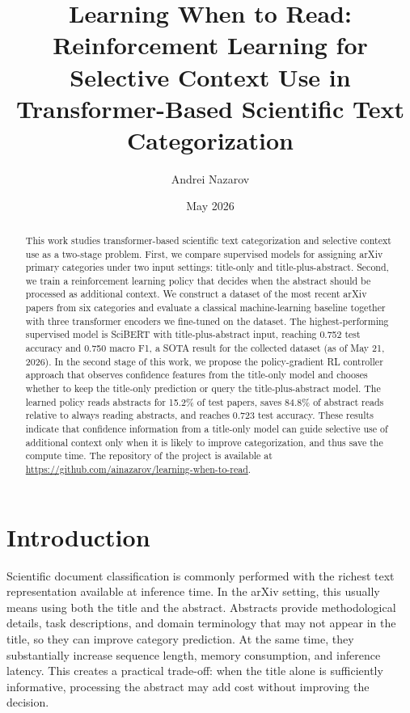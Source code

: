 \documentclass{article}
\title{Learning When to Read: Reinforcement Learning for Selective Context Use in Transformer-Based Scientific Text Categorization}
\author{Andrei Nazarov}
\date{May 2026}
\begin{document}
\maketitle

\begin{abstract}
This work studies transformer-based scientific text categorization and selective context use as a two-stage problem. First, we compare supervised models for assigning arXiv primary categories under two input settings: title-only and title-plus-abstract. Second, we train a reinforcement learning policy that decides when the abstract should be processed as additional context. We construct a dataset of the most recent arXiv papers from six categories and evaluate a classical machine-learning baseline together with three transformer encoders we fine-tuned on the dataset. The highest-performing supervised model is SciBERT with title-plus-abstract input, reaching 0.752 test accuracy and 0.750 macro F1, a SOTA result for the collected dataset (as of May 21, 2026). In the second stage of this work, we propose the policy-gradient RL controller approach that observes confidence features from the title-only model and chooses whether to keep the title-only prediction or query the title-plus-abstract model. The learned policy reads abstracts for 15.2\% of test papers, saves 84.8\% of abstract reads relative to always reading abstracts, and reaches 0.723 test accuracy. These results indicate that confidence information from a title-only model can guide selective use of additional context only when it is likely to improve categorization, and thus save the compute time.
The repository of the project is available at \url{https://github.com/ainazarov/learning-when-to-read}.
\end{abstract}

\section{Introduction}

Scientific document classification is commonly performed with the richest text representation available at inference time. In the arXiv setting, this usually means using both the title and the abstract. Abstracts provide methodological details, task descriptions, and domain terminology that may not appear in the title, so they can improve category prediction. At the same time, they substantially increase sequence length, memory consumption, and inference latency. This creates a practical trade-off: when the title alone is sufficiently informative, processing the abstract may add cost without improving the decision.
\end{document}
